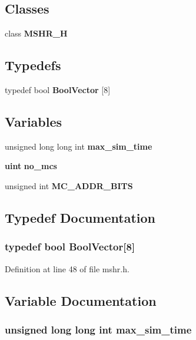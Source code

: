\subsection*{Classes}
\begin{CompactItemize}
\item 
class {\bf MSHR\_\-H}
\end{CompactItemize}
\subsection*{Typedefs}
\begin{CompactItemize}
\item 
typedef bool {\bf BoolVector} [8]
\end{CompactItemize}
\subsection*{Variables}
\begin{CompactItemize}
\item 
unsigned long long int {\bf max\_\-sim\_\-time}
\item 
{\bf uint} {\bf no\_\-mcs}
\item 
unsigned int {\bf MC\_\-ADDR\_\-BITS}
\end{CompactItemize}


\subsection{Typedef Documentation}
\subsubsection[{BoolVector}]{\setlength{\rightskip}{0pt plus 5cm}typedef bool {\bf BoolVector}[8]}\label{mshr_8h_06efeb479cce937a4455bf62cdea657c}




Definition at line 48 of file mshr.h.

\subsection{Variable Documentation}
\subsubsection[{max\_\-sim\_\-time}]{\setlength{\rightskip}{0pt plus 5cm}unsigned long long int {\bf max\_\-sim\_\-time}}\label{mshr_8h_35eb3b8621b39fb3b39217f5fb55bb31}





